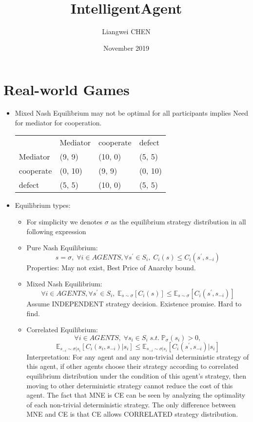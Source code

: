 \documentclass{article}
\title{IntelligentAgent}
\author{Liangwei CHEN }
\date{November 2019}
\begin{document}
\maketitle

\section {Real-world Games}
\begin{itemize}
    \item Mixed Nash Equilibrium may not be optimal for all participants implies Need for mediator for cooperation.
\begin{tabular}{llll}
          & Mediator      & cooperate & defect \\
Mediator     & (9, 9)  & (10, 0)   & (5, 5) \\
cooperate & (0, 10) & (9, 9)    & (0, 10) \\
defect    & (5, 5)  & (10, 0)   & (5, 5)
\end{tabular}

    \item Equilibrium types: 
    \begin{itemize}
        \item For simplicity we denotes $\sigma$ as the equilibrium strategy distribution in all following expression
        \item Pure Nash Equilibrium: $$s = \sigma,\; \forall i \in AGENTS, \forall s^{'} \in S_{i}, \; C_{i}(s) \leq C_{i}(s^{'}, s_{-i})$$ 
        Properties: May not exist, Best Price of Anarchy bound.
        
        \item Mixed Nash Equilibrium: $$\forall i \in AGENTS, \forall s^{'} \in S_{i}, \; \mathbb{E}_{s\sim \sigma}[C_{i}(s)] \leq \mathbb{E}_{s\sim\sigma}[C_{i}(s^{'}, s_{-i})]$$
        Assume INDEPENDENT strategy decision. Existence promise. Hard to find.
        
        \item Correlated Equilibrium: 
        $$\forall i \in AGENTS,\; \forall s_{i} \in S_{i}\; s.t.\; \mathbb{P}_{\sigma}(s_{i})>0,$$
        $$\mathbb{E}_{s_{-i}\sim \sigma | s_{i}}[C_{i}(s_{i}, s_{-i}) | s_{i}]
        \leq \mathbb{E}_{s_{-i} \sim \sigma | s_{i}}[C_{i}(s^{'}, s_{-i}) | s_{i}]$$
        Interpretation: For any agent and any non-trivial deterministic strategy of this agent, if other agents choose their strategy according to correlated equilibrium distribution under the condition of this agent's strategy, then moving to other deterministic strategy cannot reduce the cost of this agent. \newline
        The fact that MNE is CE can be seen by analyzing the optimality of each non-trivial deterministic strategy. The only difference between MNE and CE is that CE allows CORRELATED strategy distribution.
        

\end{itemize}
\end{itemize}
\end{document}
